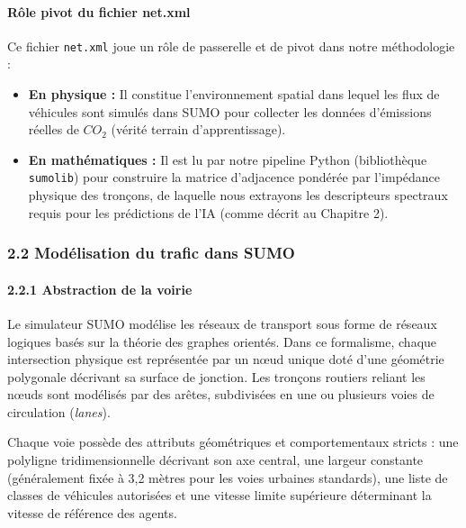 \documentclass[10pt, a4paper]{article}
\providecommand{\tightlist}{}
\begin{document}
\paragraph{Rôle pivot du fichier
net.xml}\label{ruxf4le-pivot-du-fichier-net.xml}

Ce fichier \texttt{net.xml} joue un rôle de passerelle et de pivot dans
notre méthodologie :

\begin{itemize}
\tightlist
\item
  \textbf{En physique :} Il constitue l'environnement spatial dans
  lequel les flux de véhicules sont simulés dans SUMO pour collecter les
  données d'émissions réelles de \(CO_2\) (vérité terrain
  d'apprentissage).
\item
  \textbf{En mathématiques :} Il est lu par notre pipeline Python
  (bibliothèque \texttt{sumolib}) pour construire la matrice d'adjacence
  pondérée par l'impédance physique des tronçons, de laquelle nous
  extrayons les descripteurs spectraux requis pour les prédictions de
  l'IA (comme décrit au Chapitre 2).
\end{itemize}

\subsubsection{2.2 Modélisation du trafic dans
SUMO}\label{moduxe9lisation-du-trafic-dans-sumo}

\paragraph{2.2.1 Abstraction de la
voirie}\label{abstraction-de-la-voirie}

Le simulateur SUMO modélise les réseaux de transport sous forme de
réseaux logiques basés sur la théorie des graphes orientés. Dans ce
formalisme, chaque intersection physique est représentée par un nœud
unique doté d'une géométrie polygonale décrivant sa surface de jonction.
Les tronçons routiers reliant les nœuds sont modélisés par des arêtes,
subdivisées en une ou plusieurs voies de circulation (\emph{lanes}).

Chaque voie possède des attributs géométriques et comportementaux
stricts : une polyligne tridimensionnelle décrivant son axe central, une
largeur constante (généralement fixée à 3,2 mètres pour les voies
urbaines standards), une liste de classes de véhicules autorisées et une
vitesse limite supérieure déterminant la vitesse de référence des
agents.
\end{document}
